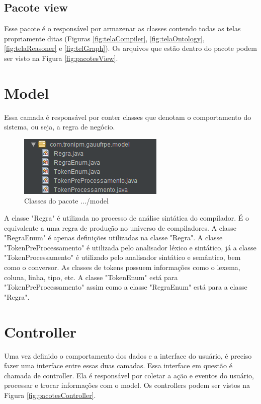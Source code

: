 \documentclass{bcc}
\begin{document}
\subsection{Pacote view}
Esse pacote é o responsável por armazenar as classes contendo todas as telas propriamente ditas (Figuras \ref{fig:telaCompiler}, \ref{fig:telaOntology}, \ref{fig:telaReasoner} e \ref{fig:telGraph}). Os arquivos que estão dentro do pacote podem ser visto na Figura \ref{fig:pacotesView}.


\section{Model}

Essa camada é responsável por conter classes que denotam o comportamento do sistema, ou seja, a regra de negócio.
\begin{figure}[H]
\centering
\includegraphics[width=.6\textwidth]{Figuras/pacote_model.png}
\caption{Classes do pacote .../model}
\label{fig:pacotesModel}
\end{figure}

A classe "Regra" é utilizada no processo de análise sintática do compilador. É o equivalente a uma regra de produção no universo de compiladores. A classe "RegraEnum" é apenas definições utilizadas na classe "Regra". A classe "TokenPreProcessamento" é utilizada pelo analisador léxico e sintático, já a classe "TokenProcessamento" é utilizado pelo analisador sintático e semântico, bem como o conversor. As classes de tokens possuem informações como o lexema, coluna, linha, tipo, etc. A classe "TokenEnum" está para "TokenPreProcessamento" assim como a classe "RegraEnum" está para a classe "Regra".

\section{Controller}

Uma vez definido o comportamento dos dados e a interface do usuário, é preciso fazer uma interface entre essas duas camadas. Essa interface em questão é chamada de controller. Ela é responsável por coletar a ação e eventos do usuário, processar e trocar informações com o model. Os controllers podem ser vistos na Figura \ref{fig:pacotesController}.
\end{document}
